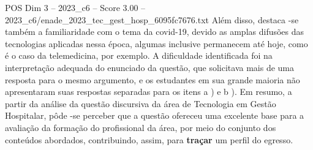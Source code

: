 \begin{textsample}{POS Dim 3 – 2023\_c6 – Score 3.00 – 2023\_c6/enade\_2023\_tec\_gest\_hosp\_6095fc7676.txt}
Além disso, destaca -se também a familiaridade com o tema da covid-19, devido as amplas difusões das tecnologias aplicadas nessa época, algumas inclusive permanecem até hoje, como é o caso da telemedicina, por exemplo.
A dificuldade identificada foi na interpretação adequada do enunciado da questão, que solicitava mais de uma resposta para o mesmo argumento, e os estudantes em sua grande maioria não apresentaram suas respostas separadas para os itens a ) e b ).
Em resumo, a partir da análise da questão discursiva da área de Tecnologia em Gestão Hospitalar, pôde -se perceber que a questão ofereceu uma excelente base para a avaliação da formação do profissional da área, por meio do conjunto dos conteúdos abordados, contribuindo, assim, para \textbf{traçar} um perfil do egresso.

\end{textsample}
